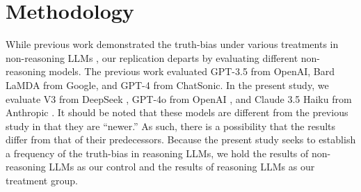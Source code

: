 \documentclass{article}
\begin{document}


\section{Methodology}

While previous work demonstrated the truth-bias under various treatments in non-reasoning LLMs \citep{markowitz_generative_2024}, our replication departs by evaluating different non-reasoning models. The previous work evaluated GPT-3.5 from OpenAI, Bard LaMDA from Google, and GPT-4 from ChatSonic. In the present study, we evaluate V3 from DeepSeek \citep{deepseekai2025deepseekv3technicalreport}, GPT-4o from OpenAI \citep{openai2024gpt4ocard}, and Claude 3.5 Haiku from Anthropic \citep{anthropic_claude_2024}. It should be noted that these models are different from the previous study in that they are ``newer.'' As such, there is a possibility that the results differ from that of their predecessors. Because the present study seeks to establish a frequency of the truth-bias in reasoning LLMs, we hold the results of non-reasoning LLMs as our control and the results of reasoning LLMs as our treatment group.

\end{document}
